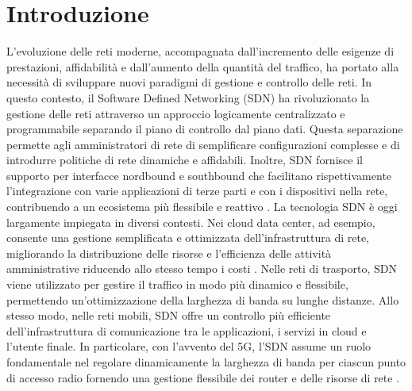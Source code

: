 \chapter{Introduzione}
L’evoluzione delle reti moderne, accompagnata dall’incremento delle esigenze di prestazioni, affidabilità e dall'aumento della quantità del traffico, ha portato alla necessità di sviluppare nuovi paradigmi di gestione e controllo delle reti. 
\newline In questo contesto, il Software Defined Networking (SDN) ha rivoluzionato la gestione delle reti attraverso un approccio logicamente centralizzato e programmabile separando il piano di controllo dal piano dati.
Questa separazione permette agli amministratori di rete di semplificare configurazioni complesse e di introdurre politiche di rete dinamiche e affidabili. 
Inoltre, SDN fornisce il supporto per interfacce nordbound e southbound che facilitano rispettivamente l'integrazione con varie applicazioni di terze parti e con i dispositivi nella rete, contribuendo a un ecosistema più flessibile e reattivo \cite{sdnart}.
\newline La tecnologia SDN è oggi largamente impiegata in diversi contesti. 
Nei cloud data center, ad esempio, consente una gestione semplificata e ottimizzata dell’infrastruttura di rete, migliorando la distribuzione delle risorse e l'efficienza  delle attività amministrative riducendo allo stesso tempo i costi \cite{datacent}. 
Nelle reti di trasporto, SDN viene utilizzato per gestire il traffico in modo più dinamico e flessibile, permettendo un'ottimizzazione della larghezza di banda su lunghe distanze. Allo stesso modo, 
nelle reti mobili, SDN offre un controllo più efficiente dell'infrastruttura di comunicazione
tra le applicazioni, i servizi in cloud e l'utente finale. 
In particolare, con l'avvento del 5G, l'SDN assume un ruolo fondamentale nel regolare dinamicamente la larghezza di banda per ciascun punto di accesso radio fornendo una gestione flessibile dei router e delle risorse di rete\cite{5g} \cite{5gart}.
